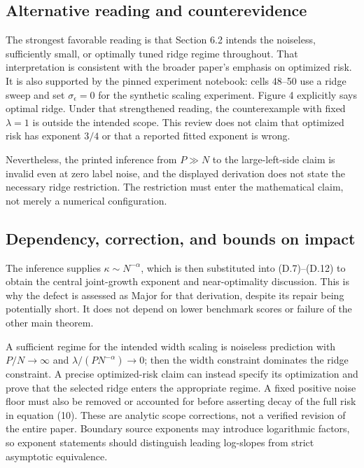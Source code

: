 \documentclass[10pt]{article}
\begin{document}
\subsection*{Alternative reading and counterevidence}
The strongest favorable reading is that Section 6.2 intends the noiseless, sufficiently small, or optimally tuned ridge regime throughout. That interpretation is consistent with the broader paper’s emphasis on optimized risk. It is also supported by the pinned experiment notebook: cells 48–50 use a ridge sweep and set \(\sigma_\epsilon=0\) for the synthetic scaling experiment. Figure 4 explicitly says optimal ridge. Under that strengthened reading, the counterexample with fixed \(\lambda=1\) is outside the intended scope. This review does not claim that optimized risk has exponent \(3/4\) or that a reported fitted exponent is wrong.\par
Nevertheless, the printed inference from \(P\gg N\) to the large-left-side claim is invalid even at zero label noise, and the displayed derivation does not state the necessary ridge restriction. The restriction must enter the mathematical claim, not merely a numerical configuration.\par
\subsection*{Dependency, correction, and bounds on impact}
The inference supplies \(\kappa\sim N^{-\alpha}\), which is then substituted into (D.7)–(D.12) to obtain the central joint-growth exponent and near-optimality discussion. This is why the defect is assessed as Major for that derivation, despite its repair being potentially short. It does not depend on lower benchmark scores or failure of the other main theorem.\par
A sufficient regime for the intended width scaling is noiseless prediction with \(P/N\to\infty\) and \(\lambda/(PN^{-\alpha})\to0\); then the width constraint dominates the ridge constraint. A precise optimized-risk claim can instead specify its optimization and prove that the selected ridge enters the appropriate regime. A fixed positive noise floor must also be removed or accounted for before asserting decay of the full risk in equation (10). These are analytic scope corrections, not a verified revision of the entire paper. Boundary source exponents may introduce logarithmic factors, so exponent statements should distinguish leading log-slopes from strict asymptotic equivalence.\par
\end{document}
